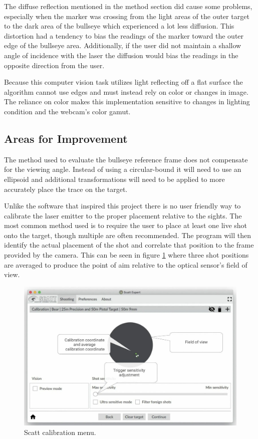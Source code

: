 \documentclass[conference]{IEEEtran}
\begin{document}
The diffuse reflection mentioned in the method section did cause some problems, especially when the marker was crossing from the light areas of the outer target to the dark area of the bullseye which experienced a lot less diffusion.
This distortion had a tendency to bias the readings of the marker toward the outer edge of the bullseye area.
Additionally, if the user did not maintain a shallow angle of incidence with the laser the diffusion would bias the readings in the opposite direction from the user.

Because this computer vision task utilizes light reflecting off a flat surface the algorithm cannot use edges and must instead rely on color or changes in image.
The reliance on color makes this implementation sensitive to changes in lighting condition and the webcam's color gamut.

\subsection{Areas for Improvement}

The method used to evaluate the bullseye reference frame does not compensate for the viewing angle. Instead of using a circular-bound it will need to use an ellipsoid and additional transformations will need to be applied to more accurately place the trace on the target.

Unlike the software that inspired this project there is no user friendly way to calibrate the laser emitter to the proper placement relative to the sights.
The most common method used is to require the user to place at least one live shot onto the target, though multiple are often recommended.
The program will then identify the actual placement of the shot and correlate that position to the frame provided by the camera.
This can be seen in figure \ref{fig:scatt_calibration} where three shot positions are averaged to produce the point of aim relative to the optical sensor's field of view.

\begin{figure}[]
	\centering
	\includegraphics[width=\linewidth]{scatt_calibration}
	\caption{Scatt \cite{scatt} calibration menu.}
	\label{fig:scatt_calibration}
\end{figure}
\end{document}
